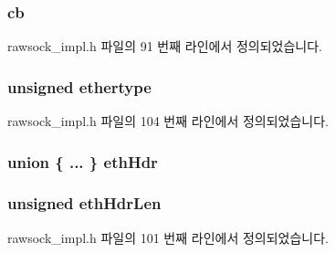 \subsubsection[{\texorpdfstring{cb}{cb}}]{ cb}\hypertarget{structbase__rawsock_a2b12273a224877b0bbbe5e7f774c7568}{}\label{structbase__rawsock_a2b12273a224877b0bbbe5e7f774c7568}


rawsock\+\_\+impl.\+h 파일의 91 번째 라인에서 정의되었습니다.

\subsubsection[{\texorpdfstring{ethertype}{ethertype}}]{\setlength{\rightskip}{0pt plus 5cm}unsigned ethertype}\hypertarget{structbase__rawsock_a71d9329c840aa95ce42cc15d25219bfb}{}\label{structbase__rawsock_a71d9329c840aa95ce42cc15d25219bfb}


rawsock\+\_\+impl.\+h 파일의 104 번째 라인에서 정의되었습니다.

\subsubsection[{\texorpdfstring{eth\+Hdr}{ethHdr}}]{\setlength{\rightskip}{0pt plus 5cm}union \{ ... \}   eth\+Hdr}\hypertarget{structbase__rawsock_a96ca5b853db73607106ccfb108196547}{}\label{structbase__rawsock_a96ca5b853db73607106ccfb108196547}
\subsubsection[{\texorpdfstring{eth\+Hdr\+Len}{ethHdrLen}}]{\setlength{\rightskip}{0pt plus 5cm}unsigned eth\+Hdr\+Len}\hypertarget{structbase__rawsock_aa718a737f571d39dde84a733a7dc08b3}{}\label{structbase__rawsock_aa718a737f571d39dde84a733a7dc08b3}


rawsock\+\_\+impl.\+h 파일의 101 번째 라인에서 정의되었습니다.

